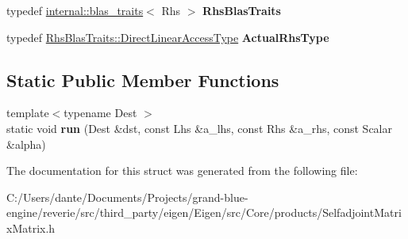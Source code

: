 \begin{DoxyCompactItemize}
typedef \mbox{\hyperlink{struct_eigen_1_1internal_1_1blas__traits}{internal\+::blas\+\_\+traits}}$<$ Rhs $>$ {\bfseries Rhs\+Blas\+Traits}
\item 
\mbox{\label{struct_eigen_1_1internal_1_1selfadjoint__product__impl_3_01_lhs_00_01_lhs_mode_00_01false_00_01_0e7941e7b3bc2131c413f23ec856f76c_a91361b7706e773ff2e1f10721ec87637}} 
typedef \mbox{\hyperlink{struct_eigen_1_1internal_1_1true__type}{Rhs\+Blas\+Traits\+::\+Direct\+Linear\+Access\+Type}} {\bfseries Actual\+Rhs\+Type}
\end{DoxyCompactItemize}
\subsection*{Static Public Member Functions}
\begin{DoxyCompactItemize}
\item 
\mbox{\label{struct_eigen_1_1internal_1_1selfadjoint__product__impl_3_01_lhs_00_01_lhs_mode_00_01false_00_01_0e7941e7b3bc2131c413f23ec856f76c_aac01d65082977579764e985402319c55}} 
{\footnotesize template$<$typename Dest $>$ }\\static void {\bfseries run} (Dest \&dst, const Lhs \&a\+\_\+lhs, const Rhs \&a\+\_\+rhs, const Scalar \&alpha)
\end{DoxyCompactItemize}


The documentation for this struct was generated from the following file\+:\begin{DoxyCompactItemize}
\item 
C\+:/\+Users/dante/\+Documents/\+Projects/grand-\/blue-\/engine/reverie/src/third\+\_\+party/eigen/\+Eigen/src/\+Core/products/Selfadjoint\+Matrix\+Matrix.\+h\end{DoxyCompactItemize}

